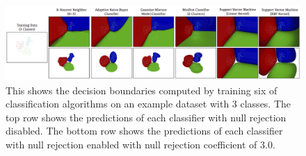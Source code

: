 \begin{figure}
	[h] \hspace{-10 mm} 
	\includegraphics[width=165mm]{figures/content/grt-null.jpg} \caption{This shows the decision boundaries computed by training six of classification algorithms on an example dataset with 3 classes. The top row shows the predictions of each classifier with null rejection disabled. The bottom row shows the predictions of each classifier with null rejection enabled with null rejection coefficient of 3.0. \cite{16} } \label{fg:grt:null} 
\end{figure}
